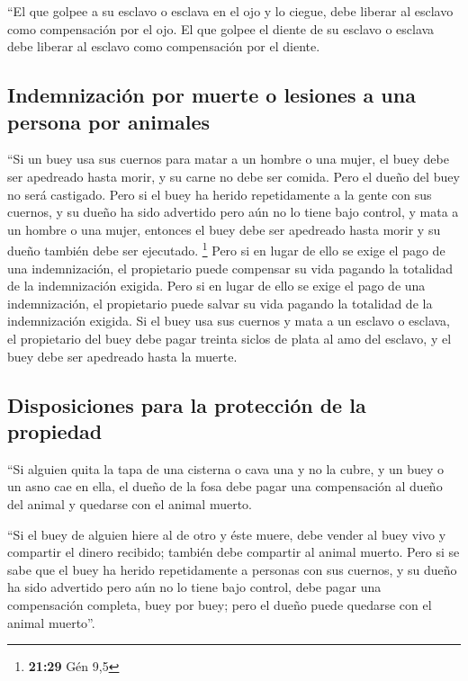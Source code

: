  ``El que golpee a su esclavo o esclava en el ojo y lo
ciegue, debe liberar al esclavo como compensación por el ojo.
 El que golpee el diente de su esclavo o esclava debe
liberar al esclavo como compensación por el diente.

\hypertarget{indemnizaciuxf3n-por-muerte-o-lesiones-a-una-persona-por-animales}{%
\subsection{Indemnización por muerte o lesiones a una persona por
animales}\label{indemnizaciuxf3n-por-muerte-o-lesiones-a-una-persona-por-animales}}

 ``Si un buey usa sus cuernos para matar a un hombre o
una mujer, el buey debe ser apedreado hasta morir, y su carne no debe
ser comida. Pero el dueño del buey no será castigado. 
Pero si el buey ha herido repetidamente a la gente con sus cuernos, y su
dueño ha sido advertido pero aún no lo tiene bajo control, y mata a un
hombre o una mujer, entonces el buey debe ser apedreado hasta morir y su
dueño también debe ser ejecutado. \footnote{\textbf{21:29} Gén 9,5}
 Pero si en lugar de ello se exige el pago de una
indemnización, el propietario puede compensar su vida pagando la
totalidad de la indemnización exigida.  Pero si en lugar
de ello se exige el pago de una indemnización, el propietario puede
salvar su vida pagando la totalidad de la indemnización exigida.
 Si el buey usa sus cuernos y mata a un esclavo o
esclava, el propietario del buey debe pagar treinta siclos de plata al
amo del esclavo, y el buey debe ser apedreado hasta la muerte.

\hypertarget{disposiciones-para-la-protecciuxf3n-de-la-propiedad}{%
\subsection{Disposiciones para la protección de la
propiedad}\label{disposiciones-para-la-protecciuxf3n-de-la-propiedad}}

 ``Si alguien quita la tapa de una cisterna o cava una y
no la cubre, y un buey o un asno cae en ella,  el dueño
de la fosa debe pagar una compensación al dueño del animal y quedarse
con el animal muerto.

 ``Si el buey de alguien hiere al de otro y éste muere,
debe vender al buey vivo y compartir el dinero recibido; también debe
compartir al animal muerto.  Pero si se sabe que el buey
ha herido repetidamente a personas con sus cuernos, y su dueño ha sido
advertido pero aún no lo tiene bajo control, debe pagar una compensación
completa, buey por buey; pero el dueño puede quedarse con el animal
muerto''.

